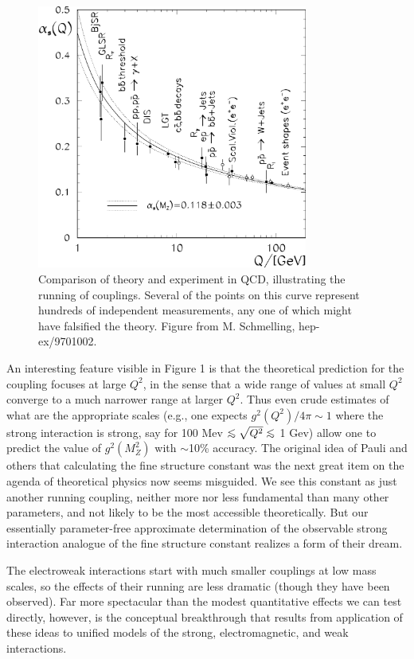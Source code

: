 \documentclass[12pt]{article}
\def\lsim{\mathrel{\raise.3ex\hbox{$<$}\mkern-14mu
             \lower0.6ex\hbox{$\sim$}}}
\begin{document}
\begin{figure}
\centerline{\includegraphics[width=3.5in]{asdrun.pdf}}
\caption{Comparison of theory and experiment in QCD,
illustrating the running of couplings.  Several of the points on this
curve represent hundreds of independent measurements, any one of which
might have falsified the theory. Figure from M. Schmelling, hep-ex/9701002. }
\label{fig1}
\end{figure}





An interesting feature visible in
Figure 1 is that the theoretical prediction for the coupling focuses
at large $Q^2$, in the sense that a wide range of values at small
$Q^2$ converge to a much narrower range at larger $Q^2$.  Thus even
crude estimates of what are the appropriate scales (e.g., one expects
$g^2(Q^2)/4 \pi \sim 1$ where the strong interaction is strong, say
for 100 Mev $\lsim \sqrt{Q^2} \lsim$ 1 Gev) allow one to predict the value of
$g^2(M_Z^2)$ with $\sim$10\% accuracy.  The original idea of Pauli and
others that calculating the fine structure constant was the next great
item on the agenda of theoretical physics now seems misguided.  We see
this constant as just another running coupling, neither more nor less
fundamental than many other parameters, and not likely to be the most
accessible theoretically.  But our essentially parameter-free approximate
determination of the observable strong interaction analogue of the
fine structure constant realizes a form of their dream. 

The
electroweak interactions start with much smaller couplings at low mass
scales, so the effects of their running are less dramatic (though they
have been observed).  Far more spectacular than the modest quantitative
effects we can test directly, however, is the conceptual breakthrough
that results from 
application of these ideas to unified models of the strong,
electromagnetic, and weak interactions.  
\end{document}
